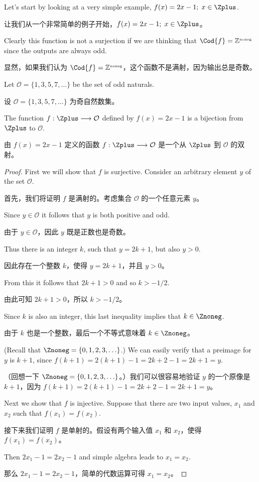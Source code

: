 Let's start by looking at a very simple example, 
$f(x)=2x-1; \; x \in \Zplus$.

让我们从一个非常简单的例子开始，$f(x)=2x-1; \; x \in \Zplus$。

Clearly this function 
is not a surjection if we are thinking that $\Cod{f}=\Naturals$
since the outputs are always odd.

显然，如果我们认为 $\Cod{f}=\Naturals$，这个函数不是满射，因为输出总是奇数。

Let ${\mathcal O} = \{1, 3, 5, 7, \ldots \}$
be the set of odd naturals.

设 ${\mathcal O} = \{1, 3, 5, 7, \ldots \}$ 为奇自然数集。

\begin{thm}
The function $f:\Zplus \longrightarrow {\mathcal O}$ defined by
$f(x) = 2x-1$ is a bijection from $\Zplus$ to ${\mathcal O}$.
\end{thm}

\begin{thm}
由 $f(x) = 2x-1$ 定义的函数 $f:\Zplus \longrightarrow {\mathcal O}$ 是一个从 $\Zplus$ 到 ${\mathcal O}$ 的双射。
\end{thm}

\begin{proof}
First we will show that $f$ is surjective.  Consider an arbitrary element
$y$ of the set $\mathcal O$.

首先，我们将证明 $f$ 是满射的。考虑集合 $\mathcal O$ 的一个任意元素 $y$。

Since $y \in {\mathcal O}$ it follows that
$y$ is both positive and odd.

由于 $y \in {\mathcal O}$，因此 $y$ 既是正数也是奇数。

Thus there is an integer $k$, such that 
$y=2k+1$, but also $y>0$.

因此存在一个整数 $k$，使得 $y=2k+1$，并且 $y>0$。

From this it follows that  $2k+1 >0$ and so
$k > -1/2$.

由此可知 $2k+1 > 0$，所以 $k > -1/2$。

Since $k$ is also an integer, this last inequality implies
that $k \in \Znoneg$.

由于 $k$ 也是一个整数，最后一个不等式意味着 $k \in \Znoneg$。

(Recall that $\Znoneg = \{0,1,2,3, \ldots \}$.)  We can easily verify that a preimage 
for $y$ is $k+1$, since $f(k+1) = 2(k+1)-1 = 2k+2-1 = 2k+1 = y$.

（回想一下 $\Znoneg = \{0,1,2,3, \ldots \}$。）我们可以很容易地验证 $y$ 的一个原像是 $k+1$，因为 $f(k+1) = 2(k+1)-1 = 2k+2-1 = 2k+1 = y$。

Next we show that $f$ is injective.  Suppose that there are two input
values, $x_1$ and $x_2$ such that $f(x_1) = f(x_2)$.

接下来我们证明 $f$ 是单射的。假设有两个输入值 $x_1$ 和 $x_2$，使得 $f(x_1) = f(x_2)$。

Then $2x_1-1 = 2x_2-1$
and simple algebra leads to $x_1=x_2$.

那么 $2x_1-1 = 2x_2-1$，简单的代数运算可得 $x_1=x_2$。
\end{proof}
 
